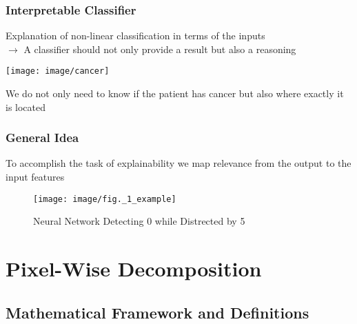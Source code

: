 \documentclass{beamer}
\begin{document}
\begin{frame}
\frametitle{Interpretable Classifier} 
\vspace{0.5cm}
Explanation of non-linear classification in terms of the inputs\\
$\rightarrow$ A classifier should not only provide a result but also a reasoning

\begin{center}
\texttt{[image: image/cancer]}
\end{center}

We do not only need to know if the patient has cancer but also where exactly it is located

\end{frame}






\begin{frame}
\frametitle{General Idea} 
\vspace{0.5cm}
To accomplish the task of explainability we map relevance from the output to the input features

\vspace{0.25cm}

\begin{center}
\begin{figure}
\texttt{[image: image/fig.\_1\_example]}
\caption{Neural Network Detecting 0 while Distrected by 5}
\end{figure}
\end{center}

\end{frame}




\section[Pixel-Wise Decomposition]{Pixel-Wise Decomposition}

\subsection[Mathematical Framework and Definitions]{Mathematical Framework and Definitions}
\end{document}
